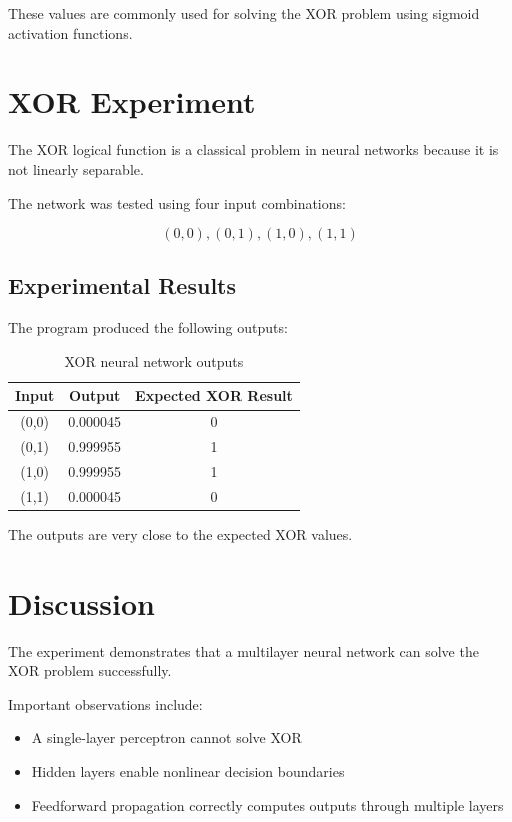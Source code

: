 \documentclass[12pt]{article}
\begin{document}
These values are commonly used for solving the XOR problem using sigmoid activation functions.

\section{XOR Experiment}

The XOR logical function is a classical problem in neural networks because it is not linearly separable.

The network was tested using four input combinations:

\[
(0,0), (0,1), (1,0), (1,1)
\]

\subsection{Experimental Results}

The program produced the following outputs:

\begin{table}[h]
\centering
\begin{tabular}{ccc}
\toprule
Input & Output & Expected XOR Result \\
\midrule
(0,0) & 0.000045 & 0 \\
(0,1) & 0.999955 & 1 \\
(1,0) & 0.999955 & 1 \\
(1,1) & 0.000045 & 0 \\
\bottomrule
\end{tabular}
\caption{XOR neural network outputs}
\end{table}

The outputs are very close to the expected XOR values.

\section{Discussion}

The experiment demonstrates that a multilayer neural network can solve the XOR problem successfully.

Important observations include:
\begin{itemize}
    \item A single-layer perceptron cannot solve XOR
    \item Hidden layers enable nonlinear decision boundaries
    \item Feedforward propagation correctly computes outputs through multiple layers
\end{itemize}
\end{document}
